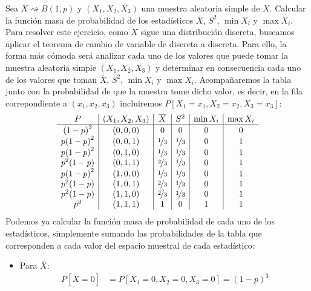\begin{ejercicio}
   Sea $X\rightsquigarrow B(1,p)$ y $(X_1, X_2, X_3)$ una muestra aleatoria simple de $X$. Calcular la función masa de probabilidad de los estadísticos $\overline{X}$, $S^2$, $\min X_i$ y $\max X_i$.\\

   \noindent
   Para resolver este ejercicio, como $X$ sigue una distribución discreta, buscamos aplicar el teorema de cambio de variable de discreta a discreta. Para ello, la forma más cómoda será analizar cada uno de los valores que puede tomar la muestra aleatoria simple $(X_1, X_2, X_3)$ y determinar en consecuencia cada uno de los valores que toman $\overline{X}$, $S^2$, $\min X_i$ y $\max X_i$. Acompañaremos la tabla junto con la probabilidad de que la muestra tome dicho valor, es decir, en la fila correpondiente a $(x_1, x_2, x_3)$ incluiremos $P[X_1 = x_1, X_2 = x_2, X_3 = x_3]$:
   \begin{equation*}
   \begin{array}{c|c|c|c|c|c}
       P & (X_1, X_2, X_3) & \overline{X} & S^2 & \min X_i & \max X_i  \\
       \hline
       {(1-p)}^{3} & (0,0,0) & 0 & 0 & 0 & 0 \\
       p{(1-p)}^{2} & (0,0,1) & \nicefrac{1}{3} & \nicefrac{1}{3} & 0 & 1 \\
       p{(1-p)}^{2} & (0,1,0) & \nicefrac{1}{3} & \nicefrac{1}{3} & 0 & 1 \\
       p^2(1-p) & (0,1,1) & \nicefrac{2}{3} & \nicefrac{1}{3} & 0 & 1 \\
       p{(1-p)}^{2} & (1,0,0) & \nicefrac{1}{3} & \nicefrac{1}{3} & 0 & 1 \\
       p^2(1-p) & (1,0,1) & \nicefrac{2}{3} & \nicefrac{1}{3} & 0 & 1 \\
       p^2(1-p) & (1,1,0) & \nicefrac{2}{3} & \nicefrac{1}{3} & 0 & 1 \\
       p^3 & (1,1,1) & 1 & 0 & 1 & 1 
   \end{array}
   \end{equation*}
   Podemos ya calcular la función masa de probabilidad de cada uno de los estadísticos, simplemente sumando las probabilidades de la tabla que corresponden a cada valor del espacio muestral de cada estadístico:
   \begin{itemize}
       \item Para $\overline{X}$:
           \begin{align*}
               P[\overline{X} = 0] &= P[X_1 = 0, X_2 = 0, X_3=0] = {(1-p)}^{3}  \\

\end{align*}
\end{itemize}
\end{ejercicio}
